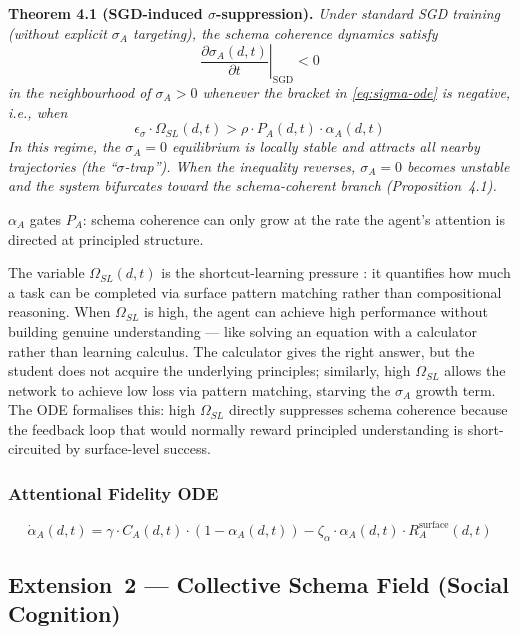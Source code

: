 \textbf{Theorem 4.1 (SGD-induced $\sigma$-suppression).} %
\textit{Under standard SGD training (without explicit $\sigma_A$ targeting), the schema coherence dynamics satisfy}
\[
\left.\frac{\partial \sigma_A(d,t)}{\partial t}\right|_{\text{SGD}} < 0
\]
\textit{in the neighbourhood of $\sigma_A > 0$ whenever the bracket in \eqref{eq:sigma-ode} is negative, i.e., when}
\[
\epsilon_{\sigma} \cdot \Omega_{SL}(d,t) > \rho \cdot P_A(d,t) \cdot \alpha_A(d,t)
\]
\textit{In this regime, the $\sigma_A = 0$ equilibrium is locally stable and attracts all nearby trajectories (the ``$\sigma$-trap''). When the inequality reverses, $\sigma_A = 0$ becomes unstable and the system bifurcates toward the schema-coherent branch (Proposition~4.1).}

$\alpha_A$ gates $P_A$: schema coherence can only grow at the rate the
agent's attention is directed at principled structure.

The variable $\Omega_{SL}(d,t)$ is the shortcut-learning pressure \citep{geirhos2020shortcutlearning}: it quantifies how much a task can be completed via surface pattern matching rather than compositional reasoning. When $\Omega_{SL}$ is high, the agent can achieve high performance without building genuine understanding --- like solving an equation with a calculator rather than learning calculus. The calculator gives the right answer, but the student does not acquire the underlying principles; similarly, high $\Omega_{SL}$ allows the network to achieve low loss via pattern matching, starving the $\sigma_A$ growth term. The ODE formalises this: high $\Omega_{SL}$ directly suppresses schema coherence because the feedback loop that would normally reward principled understanding is short-circuited by surface-level success.

\subsubsection{Attentional Fidelity ODE}
\begin{equation}\label{eq:alpha-ode}
\dot{\alpha}_A(d,t) = \gamma \cdot C_A(d,t) \cdot (1 - \alpha_A(d,t)) - \zeta_{\alpha} \cdot \alpha_A(d,t) \cdot R_A^{\text{surface}}(d,t)
\end{equation}

\subsection{Extension~2 --- Collective Schema Field (Social Cognition)}\label{sec:social}

